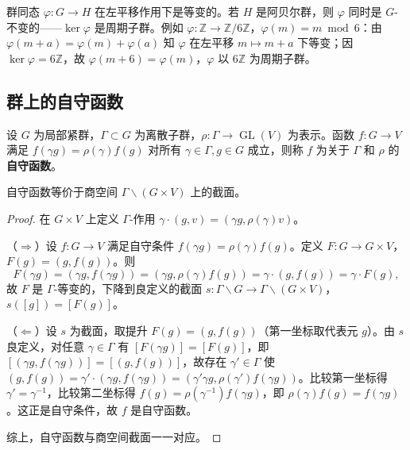 \begin{example}[群同态作为等变函数]\label{ex:homomorphism_equivariant}
群同态 $\varphi: G \to H$ 在左平移作用下是等变的。若 $H$ 是阿贝尔群，则 $\varphi$ 同时是 $G$-不变的——$\ker\varphi$ 是周期子群。例如 $\varphi:\mathbb{Z}\to\mathbb{Z}/6\mathbb{Z}$，$\varphi(m)=m\bmod 6$：由 $\varphi(m+a)=\varphi(m)+\varphi(a)$ 知 $\varphi$ 在左平移 $m\mapsto m+a$ 下等变；因 $\ker\varphi=6\mathbb{Z}$，故 $\varphi(m+6)=\varphi(m)$，$\varphi$ 以 $6\mathbb{Z}$ 为周期子群。
\end{example}

\subsection{群上的自守函数}

\begin{definition}[群上的自守函数]\label{def:automorphic_form}
设 $G$ 为局部紧群，$\Gamma \subset G$ 为离散子群，$\rho: \Gamma \to \operatorname{GL}(V)$ 为表示。函数 $f: G \to V$ 满足 $f(\gamma g) = \rho(\gamma) f(g)$ 对所有 $\gamma \in \Gamma, g \in G$ 成立，则称 $f$ 为关于 $\Gamma$ 和 $\rho$ 的\textbf{自守函数}。
\end{definition}

\begin{theorem}[自守函数的商空间刻画]\label{thm:automorphic_quotient}
自守函数等价于商空间 $\Gamma \backslash (G \times V)$ 上的截面。
\end{theorem}

\begin{proof}
在 $G\times V$ 上定义 $\Gamma$-作用 $\gamma\cdot(g,v)=(\gamma g,\rho(\gamma)v)$。

（$\Rightarrow$）设 $f:G\to V$ 满足自守条件 $f(\gamma g)=\rho(\gamma)f(g)$。定义 $F:G\to G\times V$，$F(g)=(g,f(g))$。则
\[
F(\gamma g)=(\gamma g,f(\gamma g))=(\gamma g,\rho(\gamma)f(g))=\gamma\cdot(g,f(g))=\gamma\cdot F(g),
\]
故 $F$ 是 $\Gamma$-等变的，下降到良定义的截面 $s:\Gamma\backslash G\to\Gamma\backslash(G\times V)$，$s([g])=[F(g)]$。

（$\Leftarrow$）设 $s$ 为截面，取提升 $F(g)=(g,f(g))$（第一坐标取代表元 $g$）。由 $s$ 良定义，对任意 $\gamma\in\Gamma$ 有 $[F(\gamma g)]=[F(g)]$，即 $[(\gamma g,f(\gamma g))]=[(g,f(g))]$，故存在 $\gamma'\in\Gamma$ 使 $(g,f(g))=\gamma'\cdot(\gamma g,f(\gamma g))=(\gamma'\gamma g,\rho(\gamma')f(\gamma g))$。比较第一坐标得 $\gamma'=\gamma^{-1}$，比较第二坐标得 $f(g)=\rho(\gamma^{-1})f(\gamma g)$，即 $\rho(\gamma)f(g)=f(\gamma g)$。这正是自守条件，故 $f$ 是自守函数。

综上，自守函数与商空间截面一一对应。
\end{proof}

